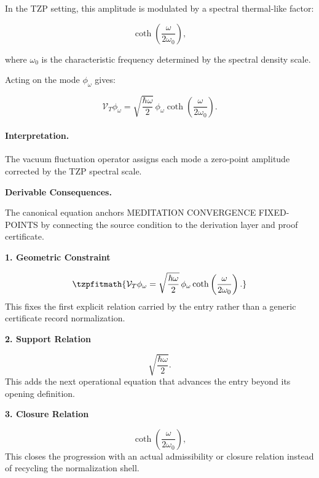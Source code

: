 In the TZP setting, this amplitude is modulated by a spectral thermal-like factor:

\begin{equation}
\coth\left(
\frac{\omega}{2\omega_0}
\right),
\end{equation}

where $\omega_0$ is the characteristic frequency determined by the spectral density scale.

Acting on the mode $\phi_{\omega}$ gives:

\begin{equation}
\boxed{
\mathcal{V}_T\phi_{\omega}
=
\sqrt{
\frac{\hbar\omega}{2}
}
\,\phi_{\omega}
\coth\left(
\frac{\omega}{2\omega_0}
\right).
}
\end{equation}

\paragraph{Interpretation.}
The vacuum fluctuation operator assigns each mode a zero-point amplitude corrected by the TZP spectral scale.

\par\vspace{0.35em}
\noindent\textbf{Derivable Consequences.}\quad
\begingroup
\footnotesize
\raggedright
The canonical equation anchors MEDITATION CONVERGENCE FIXED-POINTS by connecting the source condition to the derivation layer and proof certificate.
\par\endgroup

\noindent\textbf{1. Geometric Constraint}\par
\[
\tzpfitmath{\mathcal{V}_T\phi_{\omega} = \sqrt{ \frac{\hbar\omega}{2} } \,\phi_{\omega} \coth\left( \frac{\omega}{2\omega_0} \right).}
\]
\noindent This fixes the first explicit relation carried by the entry rather than a generic certificate record normalization.\par
\noindent\textbf{2. Support Relation}\par
\[
\sqrt{\frac{\hbar\omega}{2}}.
\]
\noindent This adds the next operational equation that advances the entry beyond its opening definition.\par
\noindent\textbf{3. Closure Relation}\par
\[
\coth\left( \frac{\omega}{2\omega_0} \right),
\]
\noindent This closes the progression with an actual admissibility or closure relation instead of recycling the normalization shell.\par


